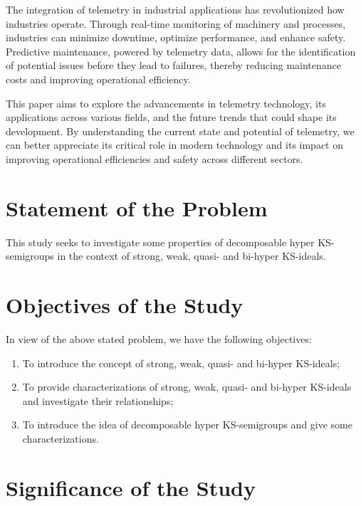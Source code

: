 {The integration of telemetry in industrial applications has revolutionized how industries operate. Through real-time monitoring of machinery and processes, industries can minimize downtime, optimize performance, and enhance safety. Predictive maintenance, powered by telemetry data, allows for the identification of potential issues before they lead to failures, thereby reducing maintenance costs and improving operational efficiency.

This paper aims to explore the advancements in telemetry technology, its applications across various fields, and the future trends that could shape its development. By understanding the current state and potential of telemetry, we can better appreciate its critical role in modern technology and its impact on improving operational efficiencies and safety across different sectors.


\section{Statement of the Problem}

This study seeks to investigate some properties of decomposable hyper KS-semigroups in the context of strong, weak, quasi- and bi-hyper KS-ideals.

\section{Objectives of the Study}

In view of the above stated problem, we have the following objectives:
\begin{enumerate}
	\item To introduce the concept of strong, weak, quasi- and bi-hyper KS-ideals;
	\item To provide characterizations of strong, weak, quasi- and bi-hyper KS-ideals and investigate their relationships;
	\item To introduce the idea of decomposable hyper KS-semigroups and give some characterizations.
\end{enumerate}

\section{Significance of the Study}

}
